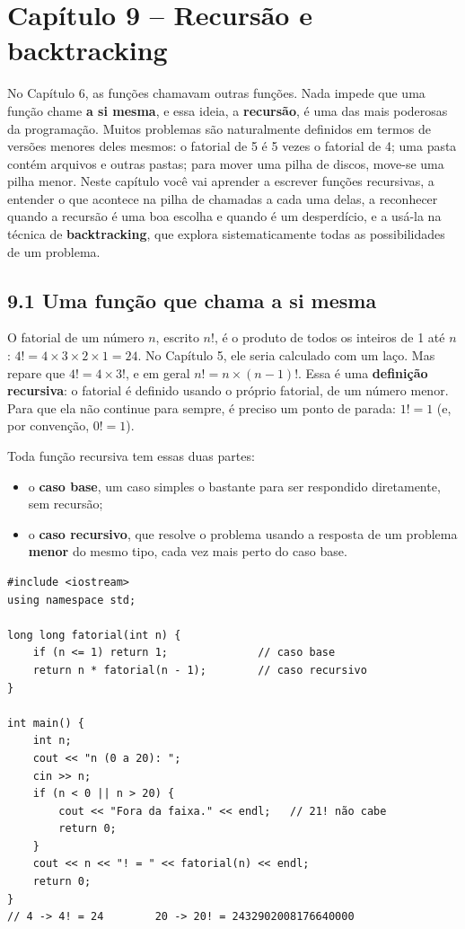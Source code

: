 \section{Capítulo 9 -- Recursão e backtracking}

No Capítulo 6, as funções chamavam outras funções. Nada impede que uma função chame \textbf{a si mesma}, e essa ideia, a \textbf{recursão}, é uma das mais poderosas da programação. Muitos problemas são naturalmente definidos em termos de versões menores deles mesmos: o fatorial de 5 é 5 vezes o fatorial de 4; uma pasta contém arquivos e outras pastas; para mover uma pilha de discos, move-se uma pilha menor. Neste capítulo você vai aprender a escrever funções recursivas, a entender o que acontece na pilha de chamadas a cada uma delas, a reconhecer quando a recursão é uma boa escolha e quando é um desperdício, e a usá-la na técnica de \textbf{backtracking}, que explora sistematicamente todas as possibilidades de um problema.

\subsection{9.1 Uma função que chama a si mesma}

O fatorial de um número $n$, escrito $n!$, é o produto de todos os inteiros de 1 até $n$: $4! = 4 \times 3 \times 2 \times 1 = 24$. No Capítulo 5, ele seria calculado com um laço. Mas repare que $4! = 4 \times 3!$, e em geral $n! = n \times (n-1)!$. Essa é uma \textbf{definição recursiva}: o fatorial é definido usando o próprio fatorial, de um número menor. Para que ela não continue para sempre, é preciso um ponto de parada: $1! = 1$ (e, por convenção, $0! = 1$).

Toda função recursiva tem essas duas partes:

\begin{itemize}
  \item o \textbf{caso base}, um caso simples o bastante para ser respondido diretamente, sem recursão;
  \item o \textbf{caso recursivo}, que resolve o problema usando a resposta de um problema \textbf{menor} do mesmo tipo, cada vez mais perto do caso base.
\end{itemize}

\begin{codigo}
\begin{Verbatim}[breaklines=true, breaksymbolleft={}, fontsize=\footnotesize]
#include <iostream>
using namespace std;

long long fatorial(int n) {
    if (n <= 1) return 1;              // caso base
    return n * fatorial(n - 1);        // caso recursivo
}

int main() {
    int n;
    cout << "n (0 a 20): ";
    cin >> n;
    if (n < 0 || n > 20) {
        cout << "Fora da faixa." << endl;   // 21! não cabe
        return 0;
    }
    cout << n << "! = " << fatorial(n) << endl;
    return 0;
}
// 4 -> 4! = 24        20 -> 20! = 2432902008176640000
\end{Verbatim}
\end{codigo}

